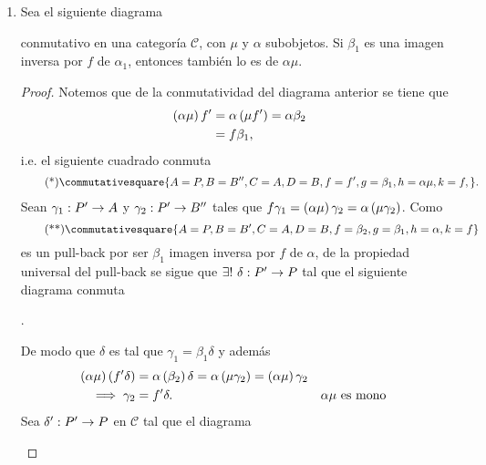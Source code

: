 \documentclass{article}
\begin{document}
\begin{enumerate}[label=\textbf{Ej \arabic*.}]
\begin{proof}
		\end{proof}
		\item Sea el siguiente diagrama 
		\begin{center}
		\end{center}
		conmutativo en una categoría $\mathscr{C}$, con $\mu$ y $\alpha$ subobjetos. Si $\beta_1$ es una imagen inversa por $f$ de $\alpha_1$, entonces también lo es de $\alpha\mu$.
		\begin{proof}
			Notemos que de la conmutatividad del diagrama anterior se tiene que
			\begin{align*}
				\left(\alpha\mu\right)f'&=\alpha\left(\mu f'\right)=\alpha\beta_2\\
				&=f\beta_1,
			\end{align*}
			i.e. el siguiente cuadrado conmuta
			\begin{align*}\tag{*}\label{pdpb}
				\commutativesquare{A=P,B=B'',C=A,D=B,f=f',g=\beta_1,h=\alpha\mu,k=f,}.
			\end{align*}
			Sean $\catarrow{\gamma_1}{P'}{A}{}$ y $\catarrow{\gamma_2}{P'}{B''}{}$ tales que $f\gamma_1=\left(\alpha\mu\right)\gamma_2=\alpha\left(\mu\gamma_2\right)$. Como
			\begin{equation*}\tag{**}\label{pborig}
				\commutativesquare{A=P,B=B',C=A,D=B,f=\beta_2,g=\beta_1,h=\alpha,k=f}
			\end{equation*} 
			 es un pull-back por ser $\beta_1$ imagen inversa por $f$ de $\alpha$, de la propiedad universal del pull-back se sigue que $\exists !\ \catarrow{\delta}{P'}{P}{}$ tal que el siguiente diagrama conmuta
			\begin{center}
				.
			\end{center}
			De modo que $\delta$ es tal que $\gamma_1=\beta_1\delta$ y además
			\begin{align*}
				\left(\alpha\mu\right)\left(f'\delta\right)&=\alpha\left(\beta_2\right)\delta=\alpha\left(\mu\gamma_2\right)=\left(\alpha\mu\right)\gamma_2\\
				\implies \gamma_2&=f'\delta. && \alpha\mu\text{ es mono}
			\end{align*}
			Sea $\catarrow{\delta'}{P'}{P}{}$ en $\mathscr{C}$ tal que el diagrama
				\begin{center}
				\end{center}	

\end{proof}
\end{enumerate}
\end{document}
